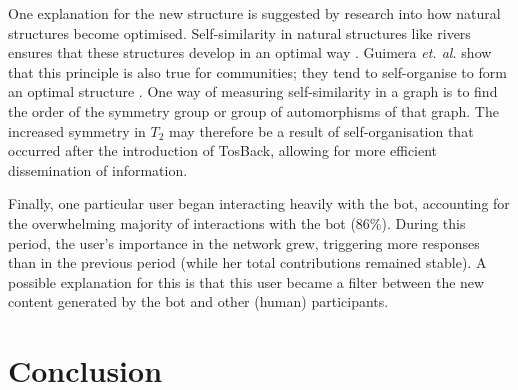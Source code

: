 \documentclass{sig-alternate-2013}
\begin{document}
One explanation for the new structure is suggested by research into how natural structures become optimised. Self-similarity in natural structures like rivers ensures that these structures develop in an optimal way \cite{murray:min}. Guimera \emph{et. al.} show that this principle is also true for communities; they tend to self-organise to form an optimal structure \cite{guimera:comm}. One way of measuring self-similarity in a graph is to find the order of the symmetry group or group of automorphisms of that graph. The increased symmetry in $T_2$ may therefore be a result of self-organisation that occurred after the introduction of TosBack, allowing for more efficient dissemination of information.

Finally, one particular user began interacting heavily with the bot, accounting for the overwhelming majority of interactions with the bot (86\%). During this period, the user's importance in the network grew, triggering more responses than in the previous period (while her total contributions remained stable). A possible explanation for this is that this user became a filter between the new content generated by the bot and other (human) participants.

\section{Conclusion}


\end{document}
